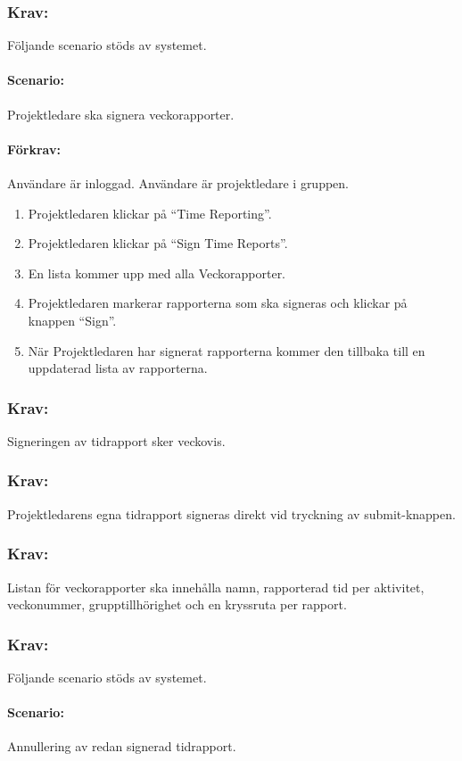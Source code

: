 \documentclass[paper=a4, fontsize=11pt,twoside]{article}
\begin{document}
	\subsubsection{Krav:}
	Följande scenario stöds av systemet.
	\paragraph{Scenario:}
	Projektledare ska signera veckorapporter.
	\paragraph{Förkrav:}
	Användare är inloggad. Användare är projektledare i gruppen.
	\begin{enumerate}
		\item Projektledaren klickar på “Time Reporting”.
		\item Projektledaren klickar på “Sign Time Reports”.
		\item En lista kommer upp med alla Veckorapporter.
		\item Projektledaren markerar rapporterna som ska signeras och klickar på knappen “Sign”.
		\item När Projektledaren har signerat rapporterna kommer den tillbaka till en uppdaterad lista av rapporterna.
	\end{enumerate}
	
	\subsubsection{Krav:}
	Signeringen av tidrapport sker veckovis.
	
	\subsubsection{Krav:}
	Projektledarens egna tidrapport signeras direkt vid tryckning av submit-knappen.
	
	\subsubsection{Krav:}
	Listan för veckorapporter ska innehålla namn, rapporterad tid per aktivitet, veckonummer, grupptillhörighet och en kryssruta per rapport.
	
	\subsubsection{Krav:}
	Följande scenario stöds av systemet.
	\paragraph{Scenario:} Annullering av redan signerad tidrapport.
\end{document}
